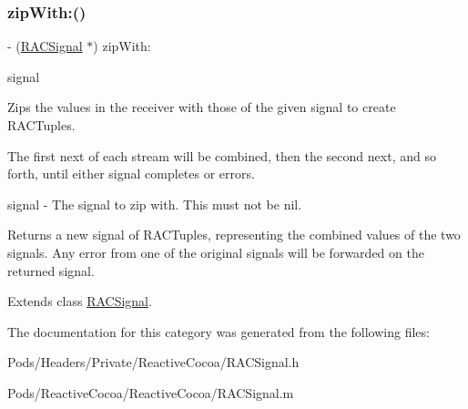 \mbox{\label{category_r_a_c_signal_07_r_a_c_stream_08_ac822f657df311327de76bc55bcae689d}} 
\subsubsection{\texorpdfstring{zip\+With\+:()}{zipWith:()}\hspace{0.1cm}{\footnotesize\ttfamily [3/3]}}
{\footnotesize\ttfamily -\/ (\mbox{\hyperlink{interface_r_a_c_signal}{R\+A\+C\+Signal}} $\ast$) zip\+With\+: \begin{DoxyParamCaption}\item[{(\mbox{\hyperlink{interface_r_a_c_signal}{R\+A\+C\+Signal}} $\ast$)}]{signal }\end{DoxyParamCaption}}

Zips the values in the receiver with those of the given signal to create R\+A\+C\+Tuples.

The first {\ttfamily next} of each stream will be combined, then the second {\ttfamily next}, and so forth, until either signal completes or errors.

signal -\/ The signal to zip with. This must not be {\ttfamily nil}.

Returns a new signal of R\+A\+C\+Tuples, representing the combined values of the two signals. Any error from one of the original signals will be forwarded on the returned signal. 

Extends class \mbox{\hyperlink{interface_r_a_c_signal_ac822f657df311327de76bc55bcae689d}{R\+A\+C\+Signal}}.



The documentation for this category was generated from the following files\+:\begin{DoxyCompactItemize}
\item 
Pods/\+Headers/\+Private/\+Reactive\+Cocoa/R\+A\+C\+Signal.\+h\item 
Pods/\+Reactive\+Cocoa/\+Reactive\+Cocoa/R\+A\+C\+Signal.\+m\end{DoxyCompactItemize}
